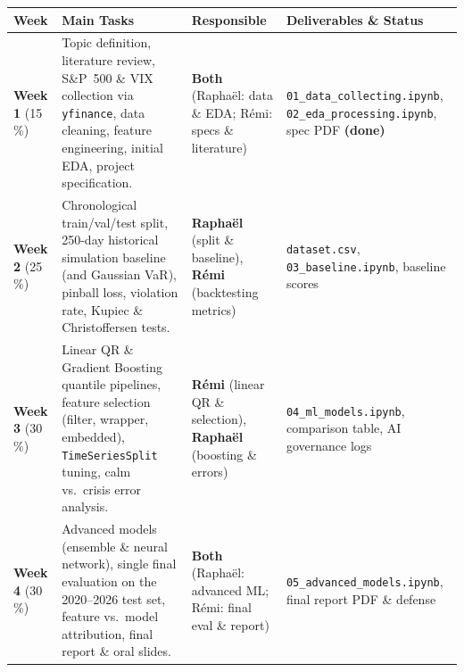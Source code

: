 \documentclass[10pt,a4paper]{article}
\newcommand{\code}[1]{\texttt{\small #1}}
\begin{document}
\begin{center}
\small
{}
\begin{tabularx}{\linewidth}{@{}>{\raggedright}p{1.6cm} X >{\raggedright}p{3.6cm} >{\raggedright\arraybackslash}p{4.2cm}@{}}
\toprule
\textbf{Week} & \textbf{Main Tasks} & \textbf{Responsible} & \textbf{Deliverables \& Status} \\
\midrule
\textbf{Week 1} (15\,\%) & Topic definition, literature review, S\&P~500 \& VIX collection via \code{yfinance}, data cleaning, feature engineering, initial EDA, project specification. & \textbf{Both} (Raphaël: data \& EDA; Rémi: specs \& literature) & \code{01\_data\_collecting.ipynb}, \code{02\_eda\_processing.ipynb}, spec PDF \textbf{(done)} \\
\textbf{Week 2} (25\,\%) & Chronological train/val/test split, 250-day historical simulation baseline (and Gaussian VaR), pinball loss, violation rate, Kupiec \& Christoffersen tests. & \textbf{Raphaël} (split \& baseline), \textbf{Rémi} (backtesting metrics) & \code{dataset.csv}, \code{03\_baseline.ipynb}, baseline scores \\
\textbf{Week 3} (30\,\%) & Linear QR \& Gradient Boosting quantile pipelines, feature selection (filter, wrapper, embedded), \code{TimeSeriesSplit} tuning, calm vs.\ crisis error analysis. & \textbf{Rémi} (linear QR \& selection), \textbf{Raphaël} (boosting \& errors) & \code{04\_ml\_models.ipynb}, comparison table, AI governance logs \\
\textbf{Week 4} (30\,\%) & Advanced models (ensemble \& neural network), single final evaluation on the 2020--2026 test set, feature vs.\ model attribution, final report \& oral slides. & \textbf{Both} (Raphaël: advanced ML; Rémi: final eval \& report) & \code{05\_advanced\_models.ipynb}, final report PDF \& defense \\
\bottomrule
\end{tabularx}
\end{center}

\end{document}

